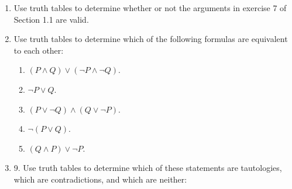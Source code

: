 \documentclass{report}
\newcommand{\sol}{\vspace{1em}\\\textbf{Solution.}\vspace{0.5em}}
\newcommand{\qed}{‎\\‎\hfill$\blacksquare$\vspace{1em}}
\begin{document}
\begin{enumerate}[leftmargin=*]
\begin{enumerate}
              \item Find a formula using only the connectives $\wedge, \vee$, and $\neg$ that is
                    equivalent to $P \mid Q$. \sol{}
                    \[
                        P \mid Q \equiv \neg(P \wedge Q)
                    \] \qed

              \item Find formulas using only the connective | that are equivalent to $\neg P$, $P
                        \vee Q$, and $P \wedge Q$.\sol{}
                    \[
                        \neg P \equiv P \mid P
                    \]
                    \[
                        P \vee Q \equiv \neg P \mid \neg Q \equiv (P \mid P) \mid (Q \mid Q)
                    \]
                    \[
                        P \wedge Q \equiv \neg(P \mid Q) \equiv (P \mid Q) \mid (P \mid Q)
                    \] \qed
          \end{enumerate}
    \item Use truth tables to determine whether or not the arguments in exercise 7 of
          Section 1.1 are valid.
    \item Use truth tables to determine which of the following formulas are equivalent to
          each other:
          \begin{enumerate}
              \item $(P \wedge Q) \vee(\neg P \wedge \neg Q)$.
              \item $\neg P \vee Q$.
              \item $(P \vee \neg Q) \wedge(Q \vee \neg P)$.
              \item $\neg(P \vee Q)$.
              \item $(Q \wedge P) \vee \neg P$.
          \end{enumerate}
    \item 9. Use truth tables to determine which of these statements are tautologies, which are contradictions, and which are neither:
\end{enumerate}
\end{document}
